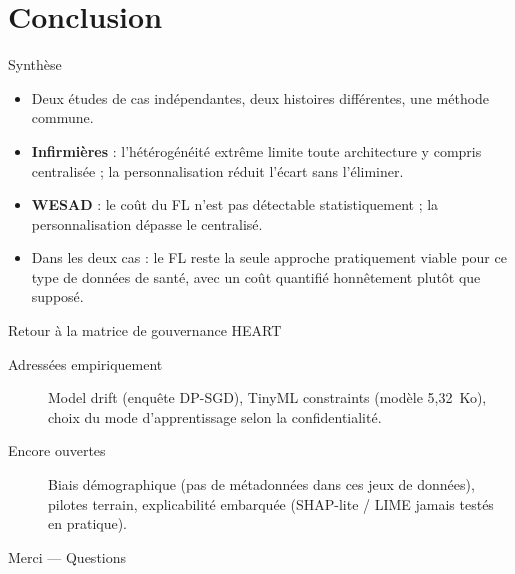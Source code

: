 \documentclass[aspectratio=169,11pt]{beamer}
\begin{document}
\section{Conclusion}

\begin{frame}{Synthèse}
  \begin{itemize}
    \item Deux études de cas indépendantes, deux histoires différentes,
      une méthode commune.
    \item \textbf{Infirmières} : l'hétérogénéité extrême limite toute
      architecture y compris centralisée ; la personnalisation réduit
      l'écart sans l'éliminer.
    \item \textbf{WESAD} : le coût du FL n'est pas détectable
      statistiquement ; la personnalisation dépasse le centralisé.
    \item Dans les deux cas : le FL reste la seule approche pratiquement
      viable pour ce type de données de santé, avec un coût quantifié
      honnêtement plutôt que supposé.
  \end{itemize}
\end{frame}

\begin{frame}{Retour à la matrice de gouvernance HEART}
  \small
  \begin{description}
    \item[Adressées empiriquement] Model drift (enquête DP-SGD), TinyML
      constraints (modèle 5,32~Ko), choix du mode d'apprentissage selon la
      confidentialité.
    \item[Encore ouvertes] Biais démographique (pas de métadonnées dans ces
      jeux de données), pilotes terrain, explicabilité embarquée
      (SHAP-lite / LIME jamais testés en pratique).
  \end{description}
\end{frame}

\begin{frame}[plain]
  \centering
  \Large Merci --- Questions
\end{frame}
\end{document}
